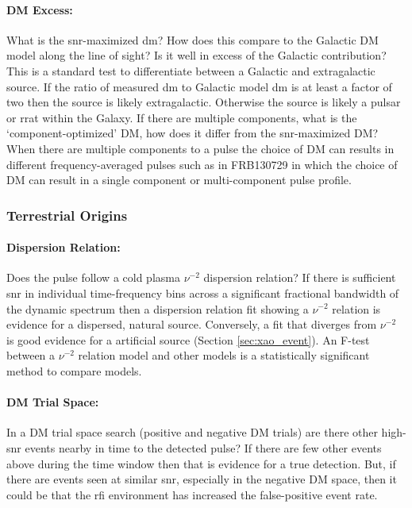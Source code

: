 \documentclass[a4paper,fleqn,usenatbib]{mnras}
\begin{document}
\paragraph{DM Excess:}

What is the \gls{snr}-maximized \gls{dm}? How does this compare to the Galactic
DM model along the line of sight? Is it well in excess of the Galactic
contribution? This is a standard test to differentiate between a Galactic and
extragalactic source. If the ratio of measured \gls{dm} to Galactic model
\gls{dm} is at least a factor of two then the source is likely extragalactic.
Otherwise the source is likely a pulsar or \gls{rrat} within the Galaxy.  If
there are multiple components, what is the `component-optimized' DM, how does it
differ from the \gls{snr}-maximized DM? When there are multiple components to a
pulse the choice of DM can results in different frequency-averaged pulses such
as in FRB130729 in which the choice of DM can result in a single component or
multi-component pulse profile. 

\subsubsection{Terrestrial Origins}

\paragraph{Dispersion Relation:}

Does the pulse follow a cold plasma $\nu^{-2}$ dispersion relation? If there is
sufficient \gls{snr} in individual time-frequency bins across a significant
fractional bandwidth of the dynamic spectrum then a dispersion relation fit
showing a $\nu^{-2}$ relation is evidence for a dispersed, natural source.
Conversely, a fit that diverges from $\nu^{-2}$ is good evidence for a
artificial source (Section \ref{sec:xao_event}). An F-test between a $\nu^{-2}$
relation model and other models is a statistically significant method to compare
models.

\paragraph{DM Trial Space:}

In a DM trial space search (positive and negative DM trials) are there other
high-\gls{snr} events nearby in time to the detected pulse? If there are few
other events above during the time window then that is evidence for a true
detection. But, if there are events seen at similar \gls{snr}, especially in the
negative DM space, then it could be that the \gls{rfi} environment has
increased the false-positive event rate.
\end{document}
